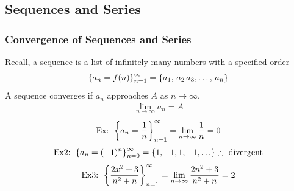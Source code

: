 \documentclass[11pt, fleqn]{article}
\begin{document}
\subsection{Sequences and Series}
\subsubsection{Convergence of Sequences and Series}
Recall, a sequence is a list of infinitely many numbers with a specified order
$$\left\{ a_n=f(n) \right\}_{n=1}^\infty=\left\{ a_1,\,a_2\,a_3,\ldots,\,a_n \right\}$$
A sequence converges if $a_n$ approaches $A$ as $n\to\infty$.
\begin{align*}
    \lim_{n\to\infty}a_n=A
\end{align*}
\begin{align*}
    \text{Ex: }\left\{ a_n=\frac{1}{n} \right\}_{n=1}^\infty=\lim_{n\to\infty}\frac{1}{n}=0
\end{align*}
\begin{align*}
    \text{Ex2: }\left\{ a_n=(-1)^n \right\}_{n=0}^\infty=\left\{ 1,-1,1,-1,\ldots \right\}\therefore\text{ divergent}
\end{align*}
\begin{align*}
    \text{Ex3: }\left\{ \frac{2x^2+3}{n^2+n} \right\}_{n=1}^\infty=\lim_{n\to\infty}\frac{2n^2+3}{n^2+n}=2
\end{align*}
\end{document}
